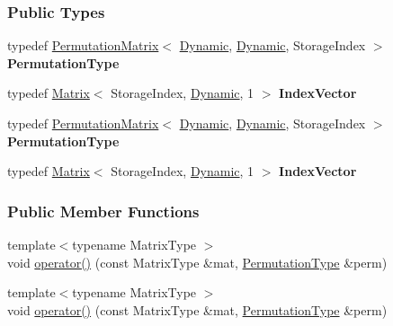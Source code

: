 \subsubsection*{Public Types}
\begin{DoxyCompactItemize}
\item 
\mbox{\label{group___ordering_methods___module_afedad7a4b7f0f018787dc8f977cdd674}} 
typedef \hyperlink{group___core___module_class_eigen_1_1_permutation_matrix}{Permutation\+Matrix}$<$ \hyperlink{namespace_eigen_ad81fa7195215a0ce30017dfac309f0b2}{Dynamic}, \hyperlink{namespace_eigen_ad81fa7195215a0ce30017dfac309f0b2}{Dynamic}, Storage\+Index $>$ {\bfseries Permutation\+Type}
\item 
\mbox{\label{group___ordering_methods___module_a9b6ec654523903abaa7daf8e669b0daa}} 
typedef \hyperlink{group___core___module_class_eigen_1_1_matrix}{Matrix}$<$ Storage\+Index, \hyperlink{namespace_eigen_ad81fa7195215a0ce30017dfac309f0b2}{Dynamic}, 1 $>$ {\bfseries Index\+Vector}
\item 
\mbox{\label{group___ordering_methods___module_afedad7a4b7f0f018787dc8f977cdd674}} 
typedef \hyperlink{group___core___module_class_eigen_1_1_permutation_matrix}{Permutation\+Matrix}$<$ \hyperlink{namespace_eigen_ad81fa7195215a0ce30017dfac309f0b2}{Dynamic}, \hyperlink{namespace_eigen_ad81fa7195215a0ce30017dfac309f0b2}{Dynamic}, Storage\+Index $>$ {\bfseries Permutation\+Type}
\item 
\mbox{\label{group___ordering_methods___module_a9b6ec654523903abaa7daf8e669b0daa}} 
typedef \hyperlink{group___core___module_class_eigen_1_1_matrix}{Matrix}$<$ Storage\+Index, \hyperlink{namespace_eigen_ad81fa7195215a0ce30017dfac309f0b2}{Dynamic}, 1 $>$ {\bfseries Index\+Vector}
\end{DoxyCompactItemize}
\subsubsection*{Public Member Functions}
\begin{DoxyCompactItemize}
\item 
{\footnotesize template$<$typename Matrix\+Type $>$ }\\void \hyperlink{group___ordering_methods___module_a708cb20191dcd79856d922f262405946}{operator()} (const Matrix\+Type \&mat, \hyperlink{group___core___module}{Permutation\+Type} \&perm)
\item 
{\footnotesize template$<$typename Matrix\+Type $>$ }\\void \hyperlink{group___ordering_methods___module_a708cb20191dcd79856d922f262405946}{operator()} (const Matrix\+Type \&mat, \hyperlink{group___core___module}{Permutation\+Type} \&perm)
\end{DoxyCompactItemize}



